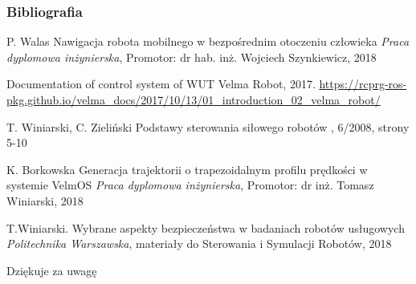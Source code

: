 
\begin{frame}
\frametitle{Bibliografia}
\footnotesize{
\begin{thebibliography}{99} %
 P. Walas
\newblock Nawigacja robota mobilnego w bezpośrednim otoczeniu człowieka
\newblock \emph{Praca dyplomowa inżynierska}, Promotor: dr hab. inż. Wojciech Szynkiewicz, 2018

 Documentation of control system of WUT Velma Robot, 2017.
\newblock \url{https://rcprg-ros-pkg.github.io/velma\_docs/2017/10/13/01\_introduction\_02\_velma\_robot/}

 T. Winiarski, C. Zieliński
\newblock Podstawy sterowania siłowego robotów
, 6/2008, strony 5-10

 K. Borkowska
\newblock Generacja trajektorii o trapezoidalnym profilu prędkości w systemie VelmOS
\newblock \emph{Praca dyplomowa inżynierska}, Promotor: dr inż. Tomasz Winiarski, 2018

 T.Winiarski.
\newblock Wybrane aspekty bezpieczeństwa w badaniach robotów usługowych
\newblock \emph{Politechnika Warszawska}, materiały do Sterowania i Symulacji Robotów, 2018 
\end{thebibliography}
}
\end{frame}


\begin{frame}
\Huge{\centerline{Dziękuje za uwagę}}
\end{frame}